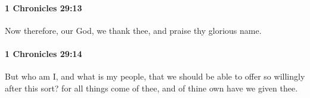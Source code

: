 		\paragraph{1 Chronicles 29:13} %
			\label{1CHRONICLES-29-13}

			Now therefore, our God, we thank thee, and praise thy glorious name.


		\paragraph{1 Chronicles 29:14} %
			\label{1CHRONICLES-29-14}

			But who am I, and what is my people, that we should be able to offer so willingly after this sort? for all things come of thee, and of thine own have we given thee.


